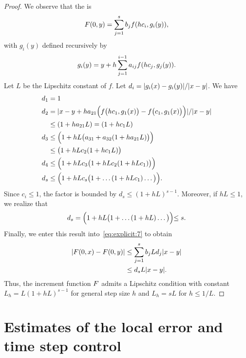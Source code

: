 \begin{proof}
  We observe that the  is
  \begin{gather}
    \label{eq:explicit:7}
    F(0, y) = \sum_{j=1}^s b_j f(hc_i, g_i(y)),
  \end{gather}
  with $g_i(y)$ defined recursively by
  \begin{gather*}
     g_i(y) = y + h \sum_{j=1}^{i-1} a_{ij} f(hc_j, g_j(y)).
  \end{gather*}
  Let $L$ be the Lipschitz constant of $f$. Let
  $d_i = \lvert g_i(x)-g_i(y)\rvert/\lvert x-y\rvert$. We have
  \begin{align*}
    d_1 &= 1
    \\
    d_2 &= \lvert x-y + h a_{21}
          \Bigl(f\bigl(hc_1,g_1(x)\bigr)
          -f\bigl(c_1,g_1(x)\bigr)
          \Bigr)\rvert/\lvert x-y\rvert
    \\ &\le (1+ha_{21}L)
         = (1+hc_{1}L)
    \\
    d_3 & \le \Bigl(1+
          h L\bigl(a_{31}+a_{32}(1+ha_{21}L)\bigr)\Bigr)
    \\ &\le \bigl(1+h L c_2(1+h c_1L)\bigr)
    \\
    d_4 & \le \Bigl(1+
          h L c_3\bigl(1+h L c_2(1+h L c_1)\bigr)\Bigr)
    \\
    d_s & \le
          \Bigl(1+ h L c_s\bigl(
          1+\dots(1+h L c_1)\dots\bigl)\Bigl).
  \end{align*}
  Since $c_i \le 1$, the factor is bounded by
  $d_s\le(1+h L)^{s-1}$. Moreover, if $h L \le 1$, we realize that
  \begin{gather*}
    d_s = \Bigl(1+ h L \bigl(1+\dots(1+h L)\dots\bigl)\Bigl) \le s.
  \end{gather*}
  Finally, we enter this result into~\eqref{eq:explicit:7} to obtain
  \begin{align*}
    \lvert F(0,x)-F(0,y)\rvert
    & \le \sum_{j=1}^s b_j L d_j \lvert x-y\rvert
    \\
    & \le d_s L \lvert x-y\rvert.
  \end{align*}
  Thus, the increment function $F$ admits a Lipschitz
  condition with constant $L_h = L(1+h L)^{s-1}$ for general step size
  $h$ and $L_h = s L$ for $h\le 1/L$.
\end{proof}

\section{Estimates of the local error
  and time step control}
  \label{section:step_size_control}

